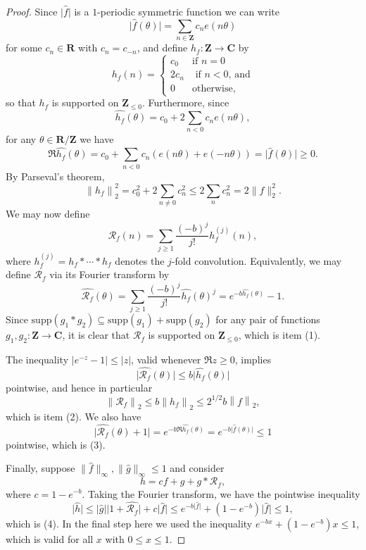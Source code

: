 \documentclass[10pt,a4paper]{amsart}
\newcommand{\Abs}[1]{\lvert #1\rvert}
\newcommand{\abs}[1]{\left\lvert #1\right\rvert}
\newcommand{\bbc}{\mathbf{C}}
\newcommand{\bbr}{\mathbf{R}}
\newcommand{\bbz}{\mathbf{Z}}
\newcommand{\norm}[1]{\left\lVert #1\right\rVert}
\newcommand{\ri}{\mathcal{R}}
\newcommand{\supp}{\mathrm{supp}}
\renewcommand{\geq}{\geqslant}
\renewcommand{\leq}{\leqslant}
\begin{document}
\begin{proof}
Since $\Abs{\widehat{f}}$ is a $1$-periodic symmetric function we can write 
\[\Abs{\widehat{f}(\theta)}=\sum_{n\in \bbz}c_ne(n\theta)\]
for some $c_n\in \bbr$ with $c_n=c_{-n}$, and define $h_f:\bbz \to \bbc$ by
\[h_f(n) = \begin{cases} c_0&\textrm{if }n=0\\
2c_n&\textrm{ if }n<0\textrm{, and}\\
0&\textrm{otherwise,}\end{cases}\]
so that $h_f$ is supported on $\bbz_{\leq 0}$. Furthermore, since
\[\widehat{h_f}(\theta)=c_0+2 \sum_{n<0}c_ne(n\theta),\]
for any $\theta\in \bbr/\bbz$ we have
\[\Re \widehat{h_f}(\theta) = c_0+\sum_{n<0}c_n(e(n\theta)+e(-n\theta))= \Abs{\widehat{f}(\theta)} \geq 0.\]
By Parseval's theorem,
\[\norm{h_f}_2^2=c_0^2+2\sum_{n\neq 0}c_n^2\leq 2\sum_n c_n^2=2\| f\|_2^2.\]
We may now define
\[\ri_f(n) = \sum_{j\geq 1}\frac{(-b)^j}{j!} h_f^{(j)}(n),\]
where $h_f^{(j)}=h_f\ast\cdots\ast h_f$ denotes the $j$-fold convolution. Equivalently, we may define  $\ri_f$ via its Fourier transform by
\[\widehat{\ri_f}(\theta)=\sum_{j\geq 1}\frac{(-b)^j}{j!}\widehat{h_f}(\theta)^j=e^{-b\widehat{h_f}(\theta)}-1.\]
Since $\supp(g_1\ast g_2)\subseteq \supp(g_1)+\supp(g_2)$ for any pair of functions $g_1, g_2 : \bbz \rightarrow \bbc$, it is clear that $\ri_f$ is supported on $\bbz_{\leq 0}$, which is item (1). 

The inequality $\abs{e^{-z}-1}\leq \abs{z}$, valid whenever $\Re z\geq 0$, implies 
\[\Abs{\widehat{\ri_f}(\theta)} \leq b\Abs{\widehat{h_f}(\theta)}\]
pointwise, and hence in particular
\[\norm{\ri_f}_2\leq b\norm{h_f}_2\leq 2^{1/2}b\norm{f}_2,\] which is item (2).
We also have
\[\Abs{\widehat{\ri_f}(\theta)+1}= e^{-b\Re \widehat{h_f}(\theta)}=e^{-b\Abs{\widehat{f}(\theta)}}\leq 1\]
pointwise, which is (3). 

Finally, suppose $\|\widehat{f} \|_{\infty},\| \widehat{g}\|_\infty \leq 1$ and consider
\[h=cf+g+g\ast \ri_f,\] where $c = 1 - e^{-b}$.
Taking the Fourier transform, we have the pointwise inequality
\[\Abs{\widehat{h}}\leq \Abs{\widehat{g}}\Abs{1+\widehat{\ri_f}}+c\Abs{\widehat{f}}\leq e^{-b\Abs{\widehat{f}}}+(1 - e^{-b})\Abs{\widehat{f}} \leq 1,\] which is (4). 
In the final step here we used the inequality $e^{-bx}+(1 - e^{-b})x\leq 1$, which is valid for all $x$ with $0\leq x\leq 1$. 
\end{proof}
\end{document}
